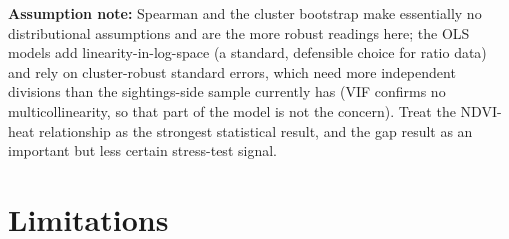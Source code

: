 \documentclass[
  letterpaper,
  DIV=11,
  numbers=noendperiod]{scrartcl}
\begin{document}
\textbf{Assumption note:} Spearman and the cluster bootstrap make
essentially no distributional assumptions and are the more robust
readings here; the OLS models add linearity-in-log-space (a standard,
defensible choice for ratio data) and rely on cluster-robust standard
errors, which need more independent divisions than the sightings-side
sample currently has (VIF confirms no multicollinearity, so that part of
the model is not the concern). Treat the NDVI-heat relationship as the
strongest statistical result, and the gap result as an important but
less certain stress-test signal.

\section{Limitations}\label{limitations}
\end{document}
